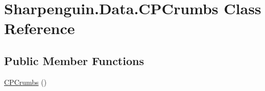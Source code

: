 \hypertarget{classSharpenguin_1_1Data_1_1CPCrumbs}{\section{Sharpenguin.\-Data.\-C\-P\-Crumbs Class Reference}
\label{classSharpenguin_1_1Data_1_1CPCrumbs}
}
\subsection*{Public Member Functions}
\begin{DoxyCompactItemize}
\item 
\hyperlink{classSharpenguin_1_1Data_1_1CPCrumbs_aee8823e5bc4e647ba69af9c488e9b16d}{C\-P\-Crumbs} ()
\end{DoxyCompactItemize}
